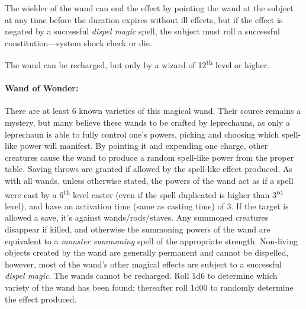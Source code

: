 \begin{multicols}{2}
The wielder of the wand can end the effect by pointing the wand at the subject at any time before the duration expires without ill effects, but if the effect is negated by a successful \textit{dispel magic} spell, the subject must roll a successful constitution---system shock check or die.

The wand can be recharged, but only by a wizard of 12\textsuperscript{th} level or higher.

\paragraph{Wand of Wonder:} There are at least 6 known varieties of this magical wand.  Their source remains a mystery, but many believe these wands to be crafted by leprechauns, as only a leprechaun is able to fully control one's powers, picking and choosing which spell-like power will manifest.  By pointing it and expending one charge, other creatures cause the wand to produce a random spell-like power from the proper table.  Saving throws are granted if allowed by the spell-like effect produced.  As with all wands, unless otherwise stated, the powers of the wand act as if a spell were cast by a 6\textsuperscript{th} level caster (even if the spell duplicated is higher than 3\textsuperscript{rd} level), and have an activation time (same as casting time) of 3.  If the target is allowed a save, it's against wands/rods/staves.  Any summoned creatures disappear if killed, and otherwise the summoning powers of the wand are equivalent to a \textit{monster summoning} spell of the appropriate strength.  Non-living objects created by the wand are generally permanent and cannot be dispelled, however, most of the wand's other magical effects are subject to a successful \textit{dispel magic}.  The wands cannot be recharged.  Roll 1d6 to determine which variety of the wand has been found; thereafter roll 1d00 to randomly determine the effect produced.

\end{multicols}


